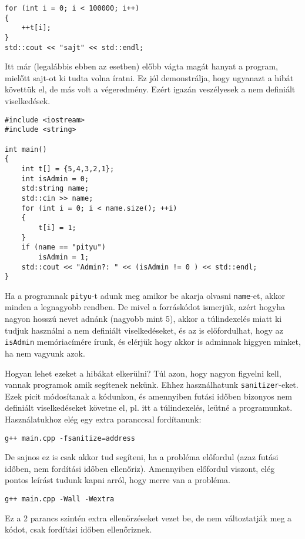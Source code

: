 \documentclass[a4paper,11.5pt]{article}
\begin{document}
		\begin{lstlisting}
for (int i = 0; i < 100000; i++)
{
	++t[i];
}
std::cout << "sajt" << std::endl;
		\end{lstlisting} 
		Itt már (legalábbis ebben az esetben) előbb vágta magát hanyat a program, mielőtt sajt-ot ki tudta volna íratni. Ez jól demonstrálja, hogy ugyanazt  a hibát követtük el, de más volt a végeredmény. Ezért igazán veszélyesek a nem definiált viselkedések.
		\begin{lstlisting}
#include <iostream>
#include <string>

int main()
{
	int t[] = {5,4,3,2,1};
	int isAdmin = 0;
	std:string name;
	std::cin >> name;
	for (int i = 0; i < name.size(); ++i)
	{
		t[i] = 1;
	}
	if (name == "pityu")
		isAdmin = 1;
	std::cout << "Admin?: " << (isAdmin != 0 ) << std::endl;
}
		\end{lstlisting}
		Ha a programnak \texttt{pityu}-t adunk meg amikor be akarja olvasni \texttt{name}-et, akkor minden a legnagyobb rendben. De mivel a forráskódot ismerjük, azért hogyha nagyon hosszú nevet adnánk (nagyobb mint 5), akkor a túlindexelés miatt ki tudjuk használni a nem definiált viselkedéseket, és az is előfordulhat, hogy az \texttt{isAdmin} memóriacímére írunk, és elérjük hogy akkor is adminnak higgyen minket, ha nem vagyunk azok.
		\medskip
		
		Hogyan lehet ezeket a hibákat elkerülni? Túl azon, hogy nagyon figyelni kell, vannak programok amik segítenek nekünk. Ehhez használhatunk \texttt{sanitizer}-eket. Ezek picit módosítanak a kódunkon, és amennyiben futási időben bizonyos nem definiált viselkedéseket követne el, pl. itt a túlindexelés, leütné a programunkat. Használatukhoz elég egy extra paranccsal fordítanunk:
		
		{\centering\texttt{g++ main.cpp -fsanitize=address}\par }
		
		De sajnos ez is csak akkor tud segíteni, ha a probléma előfordul (azaz futási időben, nem fordítási időben ellenőriz). Amennyiben előfordul viszont, elég pontos leírást tudunk kapni arról, hogy merre van a probléma.
		
		{\centering \texttt{g++ main.cpp -Wall -Wextra} \par}
		
		Ez a 2 parancs szintén extra ellenőrzéseket vezet be, de nem változtatják meg a kódot, csak fordítási időben ellenőriznek.
\end{document}
